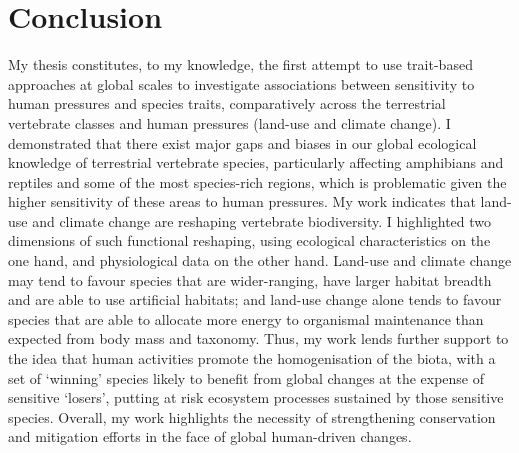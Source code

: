 \section{Conclusion}
My thesis constitutes, to my knowledge, the first attempt to use trait-based approaches at global scales to investigate associations between sensitivity to human pressures and species traits, comparatively across the terrestrial vertebrate classes and human pressures (land-use and climate change). I demonstrated that there exist major gaps and biases in our global ecological knowledge of terrestrial vertebrate species, particularly affecting amphibians and reptiles and some of the most species-rich regions, which is problematic given the higher sensitivity of these areas to human pressures. My work indicates that land-use and climate change are reshaping vertebrate biodiversity. I highlighted two dimensions of such functional reshaping, using ecological characteristics on the one hand, and physiological data on the other hand. Land-use and climate change may tend to favour species that are wider-ranging, have larger habitat breadth and are able to use artificial habitats; and land-use change alone tends to favour species that are able to allocate more energy to organismal maintenance than expected from body mass and taxonomy. Thus, my work lends further support to the idea that human activities promote the homogenisation of the biota, with a set of `winning' species likely to benefit from global changes at the expense of sensitive `losers', putting at risk ecosystem processes sustained by those sensitive species. Overall, my work highlights the necessity of strengthening conservation and mitigation efforts in the face of global human-driven changes. 
